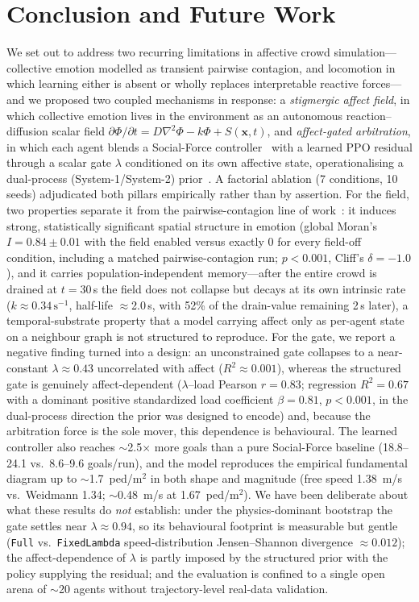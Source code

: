 \documentclass[sigconf,nonacm]{acmart}
\begin{document}
\section{Conclusion and Future Work}
We set out to address two recurring limitations in affective crowd simulation---collective emotion modelled as transient pairwise contagion, and locomotion in which learning either is absent or wholly replaces interpretable reactive forces---and we proposed two coupled mechanisms in response: a \emph{stigmergic affect field}, in which collective emotion lives in the environment as an autonomous reaction--diffusion scalar field $\partial\Phi/\partial t = D\nabla^2\Phi - k\Phi + S(\mathbf{x},t)$, and \emph{affect-gated arbitration}, in which each agent blends a Social-Force controller~\cite{helbing1995} with a learned PPO residual through a scalar gate $\lambda$ conditioned on its own affective state, operationalising a dual-process (System-1/System-2) prior~\cite{daw2005,lee2014}. A factorial ablation (7 conditions, 10 seeds) adjudicated both pillars empirically rather than by assertion. For the field, two properties separate it from the pairwise-contagion line of work~\cite{durupinar2016,bosse2013ascribe,tsai2011escapes,vanhaeringen2023}: it induces strong, statistically significant spatial structure in emotion (global Moran's $I = 0.84\pm0.01$ with the field enabled versus exactly $0$ for every field-off condition, including a matched pairwise-contagion run; $p<0.001$, Cliff's $\delta=-1.0$), and it carries population-independent memory---after the entire crowd is drained at $t=30$\,s the field does not collapse but decays at its own intrinsic rate ($k\approx0.34\,\mathrm{s}^{-1}$, half-life $\approx$2.0\,s, with 52\% of the drain-value remaining 2\,s later), a temporal-substrate property that a model carrying affect only as per-agent state on a neighbour graph is not structured to reproduce. For the gate, we report a negative finding turned into a design: an unconstrained gate collapses to a near-constant $\lambda\approx0.43$ uncorrelated with affect ($R^2\approx0.001$), whereas the structured gate is genuinely affect-dependent ($\lambda$--load Pearson $r=0.83$; regression $R^2=0.67$ with a dominant positive standardized load coefficient $\beta=0.81$, $p<0.001$, in the dual-process direction the prior was designed to encode) and, because the arbitration force is the sole mover, this dependence is behavioural. The learned controller also reaches $\sim$2.5$\times$ more goals than a pure Social-Force baseline (18.8--24.1 vs.\ 8.6--9.6 goals/run), and the model reproduces the empirical fundamental diagram up to $\sim$1.7~ped/m$^2$ in both shape and magnitude (free speed 1.38~m/s vs.\ Weidmann 1.34; $\sim$0.48~m/s at 1.67~ped/m$^2$). We have been deliberate about what these results do \emph{not} establish: under the physics-dominant bootstrap the gate settles near $\lambda\approx0.94$, so its behavioural footprint is measurable but gentle (\texttt{Full} vs.\ \texttt{FixedLambda} speed-distribution Jensen--Shannon divergence $\approx0.012$); the affect-dependence of $\lambda$ is partly imposed by the structured prior with the policy supplying the residual; and the evaluation is confined to a single open arena of $\sim$20 agents without trajectory-level real-data validation.
\end{document}
